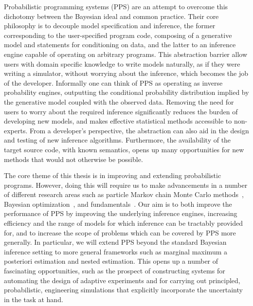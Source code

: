 
Probabilistic programming systems (PPS) \cite{carpenter2015stan,wood2014new} are an attempt to
overcome this dichotomy between the Bayesian ideal and common practice.  Their core philosophy 
is to decouple model specification and inference, the former corresponding to the user-specified 
program code, composing of a generative model and statements for conditioning on data, and the 
latter to an inference engine capable of operating on arbitrary programs.  This abstraction barrier 
allow users with domain specific knowledge to write models naturally, as if they were writing a 
simulator, without worrying about the inference, which becomes the job of the developer. Informally 
one can think of PPS as operating as inverse probability engines, outputting the conditional 
probability distribution implied by the generative model coupled with the observed data.
Removing the need for users to worry about the required inference significantly reduces the 
burden of developing new models, and makes effective statistical methods accessible to 
non-experts.  From a developer's perspective, the abstraction can also aid in the design 
and testing of new inference algorithms.  Furthermore, the availability of the target source 
code, with known semantics, opens up many opportunities for new methods that would
not otherwise be possible.

The core theme of this thesis is in improving and extending probabilistic programs.  However,
doing this will require us to make advancements in a number of different research areas such
as particle Markov chain Monte Carlo methods~\citep{andrieu2010particle,rainforth2016interacting},
Bayesian optimization~\citep{movckus1975bayesian,rainforth2016bayesian}, and \mc
fundamentals~\cite{metropolis1949monte,rainforth2016pitfalls}.  Our aim is to both improve
the performance of PPS by improving the underlying inference engines, increasing
efficiency and the range of models for which inference can be tractably provided for, and to increase
the scope of problems which can be covered by PPS more generally.  In particular, we
will extend PPS beyond the standard Bayesian inference setting to more general frameworks
such as marginal maximum a posteriori estimation and nested estimation.  This opens up a number
of fascinating opportunities, such as the prospect of constructing systems for automating the
design of adaptive experiments and for carrying out principled, probabilistic, engineering simulations
that explicitly incorporate the uncertainty in the task at hand.